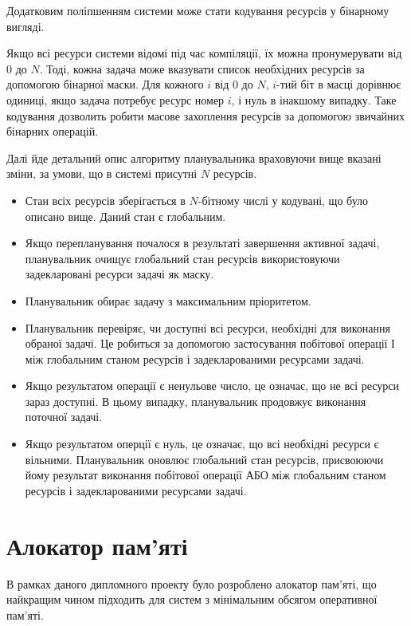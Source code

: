\documentclass[main.tex]{subfiles}
\begin{document}
Додатковим поліпшенням системи може стати кодування ресурсів у бінарному вигляді.

Якщо всі ресурси системи відомі під час компіляції, їх можна пронумерувати від $0$ до $N$. Тоді, кожна задача може вказувати список необхідних ресурсів за допомогою бінарної маски. Для кожного $i$ від $0$ до $N$, $i$-тий біт в масці дорівнює одиниці, якщо задача потребує ресурс номер $i$, і нуль в інакшому випадку. Таке кодування дозволить робити масове захоплення ресурсів за допомогою звичайних бінарних операцій.

Далі йде детальний опис алгоритму планувальника враховуючи вище вказані зміни, за умови, що в системі присутні $N$ ресурсів.

\begin{itemize}
\item Стан всіх ресурсів зберігається в $N$-бітному числі у кодувані, що було описано вище. Даний стан є глобальним.

\item Якщо перепланування почалося в результаті завершення активної задачі, планувальник очищує глобальний стан ресурсів використовуючи задекларовані ресурси задачі як маску.

\item Планувальник обирає задачу з максимальним пріоритетом.

\item Планувальник перевіряє, чи доступні всі ресурси, необхідні для виконання обраної задачі. Це робиться за допомогою застосування побітової операції І між глобальним станом ресурсів і задекларованими ресурсами задачі.

\item Якщо результатом операції є ненульове число, це означає, що не всі ресурси зараз доступні. В цьому випадку, планувальник продовжує виконання поточної задачі.

\item Якщо результатом оперції є нуль, це означає, що всі необхідні ресурси є вільними. Планувальник оновлює глобальний стан ресурсів, присвоюючи йому результат виконання побітової операції АБО між глобальним станом ресурсів і задекларованими ресурсами задачі.
\end{itemize}

\section{Алокатор пам'яті}

В рамках даного дипломного проекту було розроблено алокатор пам'яті, що найкращим чином підходить для систем з мінімальним обсягом оперативної пам'яті.
\end{document}
